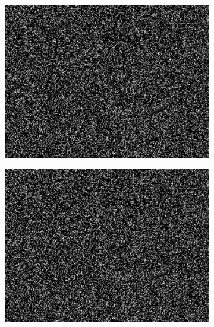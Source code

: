 \documentclass{article}
\begin{document}
\begin{figure}
	\centering
	\begin{subfigure}[htb]{0.45\textwidth}
		\centering
		\includegraphics[width=\textwidth]{../../data/vort_sim/A.png}
	\end{subfigure}
	\begin{subfigure}[htb]{0.45\textwidth}
		\centering
		\includegraphics[width=\textwidth]{../../data/vort_sim/B.png}
	\end{subfigure}


\end{figure}
\end{document}
